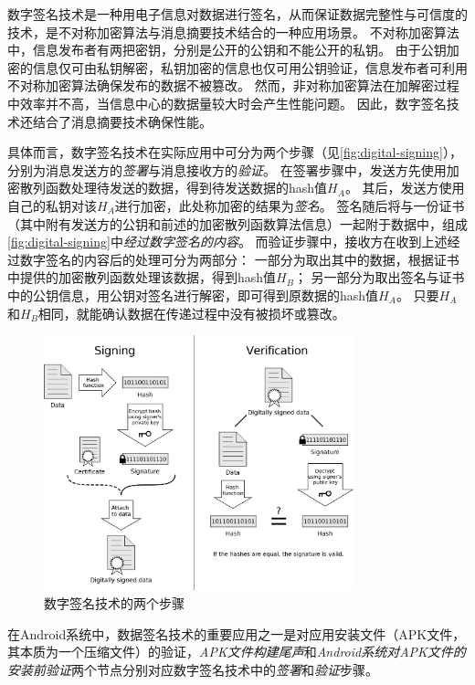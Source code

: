 数字签名技术是一种用电子信息对数据进行签名，从而保证数据完整性与可信度的技术，是不对称加密算法与消息摘要技术结合的一种应用场景。
不对称加密算法中，信息发布者有两把密钥，分别是公开的公钥和不能公开的私钥。
由于公钥加密的信息仅可由私钥解密，私钥加密的信息也仅可用公钥验证，信息发布者可利用不对称加密算法确保发布的数据不被篡改。
然而，非对称加密算法在加解密过程中效率并不高，当信息中心的数据量较大时会产生性能问题。
因此，数字签名技术还结合了消息摘要技术确保性能。

具体而言，数字签名技术在实际应用中可分为两个步骤（见\autoref{fig:digital-signing}），分别为消息发送方的\textit{签署}与消息接收方的\textit{验证}。
在签署步骤中，发送方先使用加密散列函数处理待发送的数据，得到待发送数据的hash值$H_A$。
其后，发送方使用自己的私钥对该$H_A$进行加密，此处称加密的结果为\textit{签名}。
签名随后将与一份证书（其中附有发送方的公钥和前述的加密散列函数算法信息）一起附于数据中，组成\autoref{fig:digital-signing}中\textit{经过数字签名的内容}。
而验证步骤中，接收方在收到上述经过数字签名的内容后的处理可分为两部分：
一部分为取出其中的数据，根据证书中提供的加密散列函数处理该数据，得到hash值$H_B$；
另一部分为取出签名与证书中的公钥信息，用公钥对签名进行解密，即可得到原数据的hash值$H_A$。
只要$H_A$和$H_B$相同，就能确认数据在传递过程中没有被损坏或篡改。

\begin{figure}[htbp]
	\centering
	\includegraphics[width=0.8\textwidth]{./Figures/edwin-digital-signature-diagram.jpg}
	\caption{数字签名技术的两个步骤}
	\label{fig:digital-signing}
\end{figure}

在Android系统中，数据签名技术的重要应用之一是对应用安装文件（APK文件，其本质为一个压缩文件）的验证，\textit{APK文件构建尾声}和\textit{Android系统对APK文件的安装前验证}两个节点分别对应数字签名技术中的\textit{签署}和\textit{验证}步骤。

